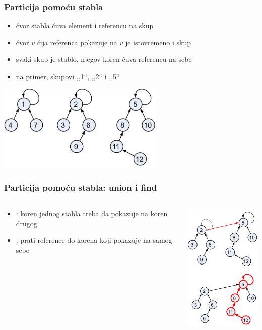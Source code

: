 \documentclass[compress]{beamer}
\begin{document}
\begin{frame}[fragile]
  \frametitle{Particija pomoću stabla}
  \begin{itemize}
    \item čvor stabla čuva element i referencu na skup
    \item čvor $v$ čija referenca pokazuje na $v$ je istovremeno i skup
    \item svaki skup je stablo, njegov koren čuva referencu na sebe
    \item na primer, skupovi ,,1``, ,,2`` i ,,5``
  \end{itemize}
  \begin{center}
    \includegraphics[width=8cm]{asp-14-pic78.png}
  \end{center}
\end{frame}

\begin{frame}[fragile]
  \frametitle{Particija pomoću stabla: union i find}
  \begin{columns}
    \begin{column}[t]{7cm}
      \begin{itemize}
        \item {}: koren jednog stabla treba da pokazuje na
          koren drugog
        \item {}: prati reference do korena koji pokazuje na 
          samog sebe
      \end{itemize}
    \end{column}
    \begin{column}[t]{5cm}
      \begin{center}
        \includegraphics[width=4cm]{asp-14-pic79.png}
      \end{center}
    \end{column}
  \end{columns}
\end{frame}
\end{document}

